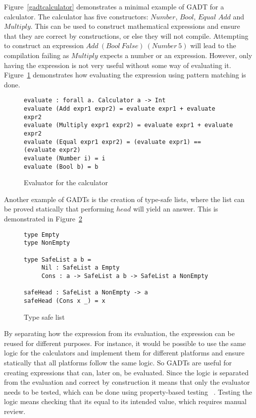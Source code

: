 Figure~\ref{gadtcalculator} demonstrates a minimal example of GADT for a
calculator. The calculator has five constructors: $Number$, $Bool$, $Equal$
$Add$ and $Multiply$. This can be used to construct mathematical expressions and
ensure that they are correct by constructions, or else they will not compile.
Attempting to construct an expression $Add\ (Bool\ False)\ (Number\ 5)$ will
lead to the compilation failing as $Multiply$ expects a number or an expression.
However, only having the expression is not very useful without some way of
evaluating it.  Figure~\ref{calculator} demonstrates how evaluating the
expression using pattern matching is done.

\begin{figure}[H]
    \begin{lstlisting}
evaluate : forall a. Calculator a -> Int
evaluate (Add expr1 expr2) = evaluate expr1 + evaluate expr2
evaluate (Multiply expr1 expr2) = evaluate expr1 + evaluate expr2
evaluate (Equal expr1 expr2) = (evaluate expr1) == (evaluate expr2)
evaluate (Number i) = i
evaluate (Bool b) = b
    \end{lstlisting}
    \caption{Evaluator for the calculator}
    \label{calculator}
\end{figure}

Another example of GADTs is the creation of type-safe lists, where the list can
be proved statically that performing $head$ will yield an answer. This is
demonstrated in Figure~\ref{safelist}

\begin{figure}[H]
    \begin{lstlisting}
type Empty
type NonEmpty

type SafeList a b =
     Nil : SafeList a Empty
     Cons : a -> SafeList a b -> SafeList a NonEmpty

safeHead : SafeList a NonEmpty -> a
safeHead (Cons x _) = x
    \end{lstlisting}
    \caption{Type safe list}
    \label{safelist}
\end{figure}

By separating how the expression from its evaluation, the expression can be
reused for different purposes. For instance, it would be possible to use the
same logic for the calculators and implement them for different platforms and
ensure statically that all platforms follow the same logic. So GADTs are useful
for creating expressions that can, later on, be evaluated.  Since the logic is
separated from the evaluation and correct by construction it means that only the
evaluator needs to be tested, which can be done using property-based testing
~\cite{hughes2016experiences}. Testing the logic means
checking that its equal to its intended value, which requires manual review.


